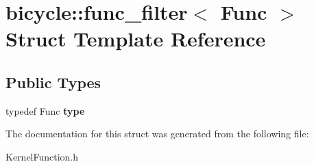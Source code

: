 \hypertarget{structbicycle_1_1func__filter}{}\section{bicycle\+:\+:func\+\_\+filter$<$ Func $>$ Struct Template Reference}
\label{structbicycle_1_1func__filter}
\subsection*{Public Types}
\begin{DoxyCompactItemize}
\item 
\mbox{\label{structbicycle_1_1func__filter_a6388729a15d62e3c7d9ca550d9d9da3b}} 
typedef Func {\bfseries type}
\end{DoxyCompactItemize}


The documentation for this struct was generated from the following file\+:\begin{DoxyCompactItemize}
\item 
Kernel\+Function.\+h\end{DoxyCompactItemize}
